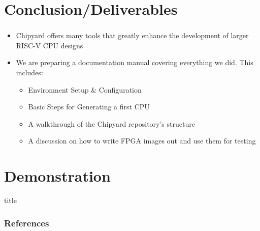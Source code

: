 \documentclass{eceday}
\begin{document}
\section{Conclusion/Deliverables}\label{sec:Conclusion_Deliverables}
\begin{frame}
  \frametitle{}
  \begin{itemize}
  \item Chipyard offers many tools that greatly enhance the development of larger RISC-V CPU designs
  \item We are preparing a documentation manual covering everything we did. This includes:
    \begin{itemize}
    \item Environment Setup \& Configuration
    \item Basic Steps for Generating a first CPU
    \item A walkthrough of the Chipyard repository's structure
    \item A discussion on how to write FPGA images out and use them for testing
    \end{itemize}
  \end{itemize}
\end{frame}

\section{Demonstration}\label{sec:Demonstration}
\begin{frame}
  \vfill
  \centering
  \begin{beamercolorbox}[sep=8pt,center,shadow=true,rounded=true]{title}
    \par%
  \end{beamercolorbox}
  \vfill
\end{frame}

\begin{frame}
  \frametitle{References}
  \printbibliography[heading=bibintoc]{}
\end{frame}
\end{document}

